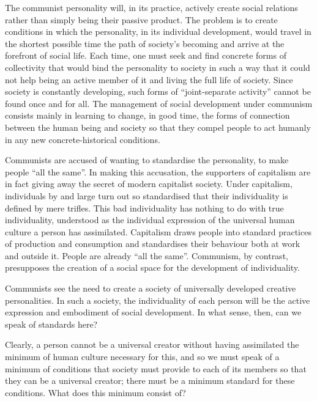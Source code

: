 \documentclass[12pt,a4paper,openany]{book}
\begin{document}
The communist personality will, in its practice, actively create social relations rather than simply being their passive product. The problem is to create conditions in which the personality, in its individual development, would travel in the shortest possible time the path of society’s becoming and arrive at the forefront of social life. Each time, one must seek and find concrete forms of collectivity that would bind the personality to society in such a way that it could not help being an active member of it and living the full life of society. Since society is constantly developing, such forms of “joint-separate activity” cannot be found once and for all. The management of social development under communism consists mainly in learning to change, in good time, the forms of connection between the human being and society so that they compel people to act humanly in any new concrete-historical conditions.

Communists are accused of wanting to standardise the personality, to make people “all the same”. In making this accusation, the supporters of capitalism are in fact giving away the secret of modern capitalist society. Under capitalism, individuals by and large turn out so standardised that their individuality is defined by mere trifles. This bad individuality has nothing to do with true individuality, understood as the individual expression of the universal human culture a person has assimilated. Capitalism draws people into standard practices of production and consumption and standardises their behaviour both at work and outside it. People are already “all the same”. Communism, by contrast, presupposes the creation of a social space for the development of individuality.

Communists see the need to create a society of universally developed creative personalities. In such a society, the individuality of each person will be the active expression and embodiment of social development. In what sense, then, can we speak of standards here?

Clearly, a person cannot be a universal creator without having assimilated the minimum of human culture necessary for this, and so we must speak of a minimum of conditions that society must provide to each of its members so that they can be a universal creator; there must be a minimum standard for these conditions. What does this minimum consist of?
\end{document}
